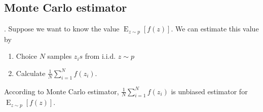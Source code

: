 \documentclass[8pt]{beamer}
\newcommand{\expe}{\operatorname{E}}
\begin{document}
\subsection{Monte Carlo estimator}

\begin{frame}{.}
  Suppose we want to know the value $\expe_{z \sim p}[f(z)]$. We can estimate this value by 
  \begin{enumerate}
    \item Choice $N$ samples $z_is$ from i.i.d. $z \sim p$
    \item Calculate $\frac{1}{N}\sum_{i=1}^N f(z_i)$.
  \end{enumerate}

  According to Monte Carlo estimator, $\frac{1}{N}\sum_{i=1}^N f(z_i)$ is unbiased estimator for $\expe_{z \sim p}[f(z)]$.
\end{frame}
\end{document}
